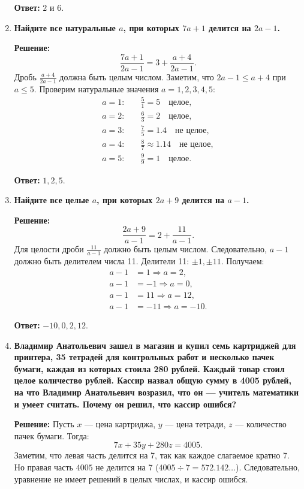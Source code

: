 \documentclass[12pt, a4paper]{article}
\begin{document}
\begin{enumerate}[label=\arabic*., wide=0pt, leftmargin=*]
\textbf{Ответ: } $2$ и $6$.

\item \textbf{Найдите все натуральные $a$, при которых $7a + 1$ делится на $2a - 1$.}

\textbf{Решение:}
\[
\frac{7a + 1}{2a - 1} = 3 + \frac{a + 4}{2a - 1}.
\]
Дробь $\frac{a + 4}{2a - 1}$ должна быть целым числом. Заметим, что $2a - 1 \leq a + 4$ при $a \leq 5$. Проверим натуральные значения $a = 1, 2, 3, 4, 5$:
\begin{align*}
a = 1: &\quad \frac{5}{1} = 5 \quad \text{целое}, \\
a = 2: &\quad \frac{6}{3} = 2 \quad \text{целое}, \\
a = 3: &\quad \frac{7}{5} = 1.4 \quad \text{не целое}, \\
a = 4: &\quad \frac{8}{7} \approx 1.14 \quad \text{не целое}, \\
a = 5: &\quad \frac{9}{9} = 1 \quad \text{целое}.
\end{align*}

\textbf{Ответ: } $1, 2, 5$.

\item \textbf{Найдите все целые $a$, при которых $2a + 9$ делится на $a - 1$.}

\textbf{Решение:}
\[
\frac{2a + 9}{a - 1} = 2 + \frac{11}{a - 1}.
\]
Для целости дроби $\frac{11}{a - 1}$ должно быть целым числом. Следовательно, $a - 1$ должно быть делителем числа 11. Делители 11: $\pm1, \pm11$. Получаем:
\begin{align*}
a - 1 &= 1 \Rightarrow a = 2, \\
a - 1 &= -1 \Rightarrow a = 0, \\
a - 1 &= 11 \Rightarrow a = 12, \\
a - 1 &= -11 \Rightarrow a = -10.
\end{align*}

\textbf{Ответ: } $-10, 0, 2, 12$.

\item \textbf{Владимир Анатольевич зашел в магазин и купил семь картриджей для принтера, 35 тетрадей для контрольных работ и несколько пачек бумаги, каждая из которых стоила 280 рублей. Каждый товар стоил целое количество рублей. Кассир назвал общую сумму в 4005 рублей, на что Владимир Анатольевич возразил, что он — учитель математики и умеет считать. Почему он решил, что кассир ошибся?}

\textbf{Решение:}
Пусть $x$ — цена картриджа, $y$ — цена тетради, $z$ — количество пачек бумаги. Тогда:
\[
7x + 35y + 280z = 4005.
\]
Заметим, что левая часть делится на 7, так как каждое слагаемое кратно 7. Но правая часть $4005$ не делится на 7 ($4005 \div 7 = 572.142\ldots$). Следовательно, уравнение не имеет решений в целых числах, и кассир ошибся.


\end{enumerate}
\end{document}
